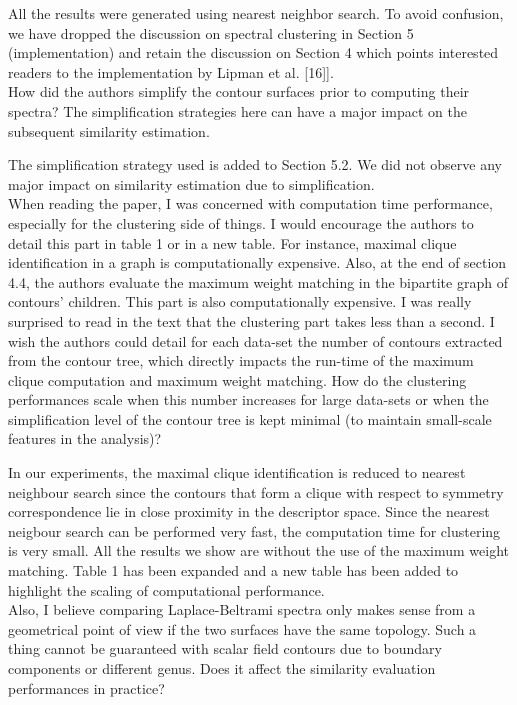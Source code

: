 \documentclass[10pt]{article}
\begin{document}
   {\color{blue}All the results were generated using nearest neighbor search.
	   To avoid confusion, we have dropped the discussion on spectral
	   clustering in Section 5 (implementation) and retain the discussion
	   on Section 4 which points interested readers to the implementation
  by Lipman et al. [16]].}\\
   
   How did the authors simplify the contour surfaces prior to computing
   their spectra? The simplification strategies here can have a major impact
   on the subsequent similarity estimation.

   {\color{blue}The simplification strategy used is added to Section 5.2. We did not observe
   any major impact on similarity estimation due to simplification.}\\

   When reading the paper, I was concerned with computation time
   performance, especially for the clustering side of things. I would
   encourage the authors to detail this part in table 1 or in a new table.
   For instance, maximal clique identification in a graph is computationally
   expensive. Also, at the end of section 4.4, the authors evaluate the
   maximum weight matching in the bipartite graph of contours' children.
   This part is also computationally expensive. I was really surprised to
   read in the text that the clustering part takes less than a 
   second. I wish the authors could detail for each data-set the number of 
   contours extracted from the contour tree, which directly impacts the
   run-time of the maximum clique computation and maximum weight matching.
   How do the clustering performances scale when this number increases for
   large data-sets or when the simplification level of the contour tree is
   kept minimal (to maintain small-scale features in the analysis)?

   {\color{blue}In our experiments, the maximal clique identification
	   is reduced to nearest neighbour search since the contours
	   that form a clique with respect to symmetry correspondence
	   lie in close proximity in the descriptor space. Since the 
	   nearest neigbour search can be performed very fast, the
	   computation time for clustering is very small. 
	   All the results we show are without the
	   use of the maximum weight matching. Table 1 
	   has been expanded and a new table has been added to highlight
   the scaling of computational performance.}\\

   Also, I believe comparing Laplace-Beltrami spectra only makes sense from
   a geometrical point of view if the two surfaces have the same topology.
   Such a thing cannot be guaranteed with scalar field contours due to
   boundary components or different genus. Does it affect the similarity
   evaluation performances in practice?
	
\end{document}
